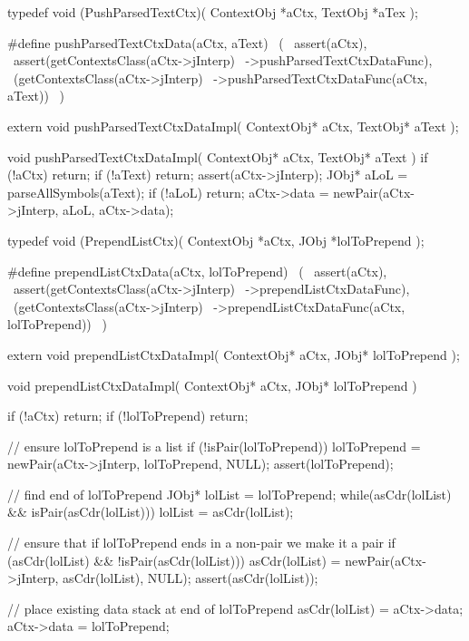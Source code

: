 \startCHeader
typedef void (PushParsedTextCtx)(
  ContextObj *aCtx,
  TextObj    *aTex
);

#define pushParsedTextCtxData(aCtx, aText)      \
  (                                             \
    assert(aCtx),                               \
    assert(getContextsClass(aCtx->jInterp)      \
      ->pushParsedTextCtxDataFunc),             \
    (getContextsClass(aCtx->jInterp)            \
      ->pushParsedTextCtxDataFunc(aCtx, aText)) \
  )
\stopCHeader

\setCHeaderStream{private}
\startCHeader
extern void pushParsedTextCtxDataImpl(
  ContextObj* aCtx,
  TextObj* aText
);
\stopCHeader
\setCHeaderStream{public}

\startCCode
void pushParsedTextCtxDataImpl(
  ContextObj* aCtx,
  TextObj* aText
) {
  if (!aCtx) return;
  if (!aText) return;
  assert(aCtx->jInterp);
  JObj* aLoL = parseAllSymbols(aText);
  if (!aLoL) return;
  aCtx->data = newPair(aCtx->jInterp, aLoL, aCtx->data);
}
\stopCCode

\startCHeader
typedef void (PrependListCtx)(
  ContextObj *aCtx,
  JObj   *lolToPrepend
);

#define prependListCtxData(aCtx, lolToPrepend)      \
  (                                                 \
    assert(aCtx),                                   \
    assert(getContextsClass(aCtx->jInterp)          \
      ->prependListCtxDataFunc),                    \
    (getContextsClass(aCtx->jInterp)                \
      ->prependListCtxDataFunc(aCtx, lolToPrepend)) \
  )
\stopCHeader

\startCHeader
extern void prependListCtxDataImpl(
  ContextObj* aCtx,
  JObj* lolToPrepend
);
\stopCHeader
\setCHeaderStream{public}

\startCCode
void prependListCtxDataImpl(
  ContextObj* aCtx,
  JObj* lolToPrepend
) {
  if (!aCtx) return;
  if (!lolToPrepend) return;

  // ensure lolToPrepend is a list
  if (!isPair(lolToPrepend)) {
    lolToPrepend = newPair(aCtx->jInterp, lolToPrepend, NULL);
    assert(lolToPrepend);
  }

  // find end of lolToPrepend
  JObj* lolList = lolToPrepend;
  while(asCdr(lolList) && isPair(asCdr(lolList))) {
    lolList = asCdr(lolList);
  }

  // ensure that if lolToPrepend ends in a non-pair we make it a pair
  if (asCdr(lolList) && !isPair(asCdr(lolList))) {
    asCdr(lolList) = newPair(aCtx->jInterp, asCdr(lolList), NULL);
    assert(asCdr(lolList));
  }

  // place existing data stack at end of lolToPrepend
  asCdr(lolList) = aCtx->data;
  aCtx->data     = lolToPrepend;
}
\stopCCode

